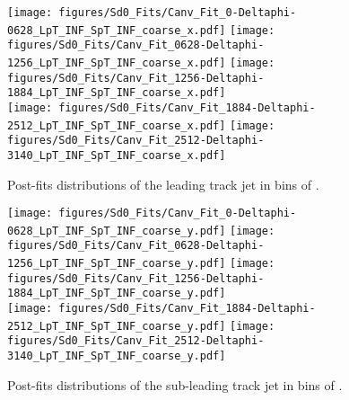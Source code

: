\begin{figure}[htbp]
  \centering
 \texttt{[image: figures/Sd0\_Fits/Canv\_Fit\_0-Deltaphi-0628\_LpT\_INF\_SpT\_INF\_coarse\_x.pdf]}
 \texttt{[image: figures/Sd0\_Fits/Canv\_Fit\_0628-Deltaphi-1256\_LpT\_INF\_SpT\_INF\_coarse\_x.pdf]}
 \texttt{[image: figures/Sd0\_Fits/Canv\_Fit\_1256-Deltaphi-1884\_LpT\_INF\_SpT\_INF\_coarse\_x.pdf]}\\
 \texttt{[image: figures/Sd0\_Fits/Canv\_Fit\_1884-Deltaphi-2512\_LpT\_INF\_SpT\_INF\_coarse\_x.pdf]}
 \texttt{[image: figures/Sd0\_Fits/Canv\_Fit\_2512-Deltaphi-3140\_LpT\_INF\_SpT\_INF\_coarse\_x.pdf]}


\caption{Post-fits \sdzero distributions of the leading track jet in bins of \dphi. }
  \label{fig:dphi-postfits-leading-subsub}
\end{figure}


\begin{figure}[htbp]
  \centering
 \texttt{[image: figures/Sd0\_Fits/Canv\_Fit\_0-Deltaphi-0628\_LpT\_INF\_SpT\_INF\_coarse\_y.pdf]}
 \texttt{[image: figures/Sd0\_Fits/Canv\_Fit\_0628-Deltaphi-1256\_LpT\_INF\_SpT\_INF\_coarse\_y.pdf]}
 \texttt{[image: figures/Sd0\_Fits/Canv\_Fit\_1256-Deltaphi-1884\_LpT\_INF\_SpT\_INF\_coarse\_y.pdf]}\\
 \texttt{[image: figures/Sd0\_Fits/Canv\_Fit\_1884-Deltaphi-2512\_LpT\_INF\_SpT\_INF\_coarse\_y.pdf]}
 \texttt{[image: figures/Sd0\_Fits/Canv\_Fit\_2512-Deltaphi-3140\_LpT\_INF\_SpT\_INF\_coarse\_y.pdf]}

\caption{Post-fits \sdzero distributions of the sub-leading track jet in bins of \dphi. }
  \label{fig:dphi-postfits-subleading-subsub}
\end{figure}



